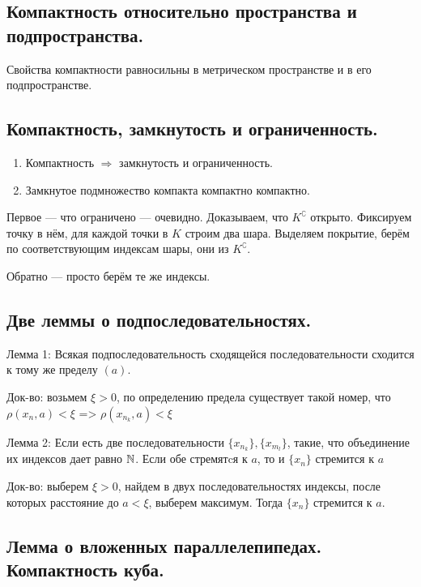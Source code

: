 \documentclass[12pt, a4paper]{article}
\begin{document}
\subsection{Компактность относительно пространства и подпространства.}

Свойства компактности равносильны 
в метрическом пространстве и в его подпространстве.


\subsection{Компактность, замкнутость и ограниченность.}

\begin{enumerate}
    \item Компактность $\Rightarrow$ замкнутость и ограниченность.
    \item Замкнутое подмножество компакта компактно компактно.
\end{enumerate}


Первое — что ограничено — очевидно. Доказываем, что $K^\complement$ открыто. 
Фиксируем точку в нём, для каждой точки в $K$ строим два шара. 
Выделяем покрытие, берём по соответствующим индексам шары, они из $K^\complement$.

Обратно — просто берём те же индексы.


\subsection{Две леммы о подпоследовательностях.}

Лемма 1: Всякая подпоследовательность сходящейся последовательности сходится к тому же пределу $(a)$.

Док-во: возьмем $\xi > 0$, по определению предела существует такой номер, что $\rho(x_n, a) < \xi$ =>  $\rho(x_{n_k}, a) < \xi$

Лемма 2: Если есть две последовательности $\{x_{n_k}\}, \{x_{m_l}\}$, такие, что объединение их индексов дает равно ${\mathbb{N}}$. Если обе стремятcя к $a$, то и $\{x_n\}$ стремится к $a$

Док-во: выберем $\xi > 0$, найдем в двух последовательностях индексы, после которых расстояние до $a < \xi$, выберем максимум. Тогда $\{x_n\}$ стремится к $a$.

\subsection{Лемма о вложенных параллелепипедах. Компактность куба.}
\end{document}
